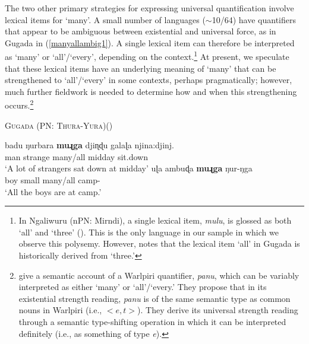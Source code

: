 \documentclass[12pt,egregdoesnotlikesansseriftitles]{scrartcl}
\begin{document}
The two other primary strategies for expressing universal quantification  involve lexical items for `many'. A small number of languages ($\sim$10/64) have quantifiers that appear to be ambiguous between existential and universal force, as in Gugada \textit{} in  (\ref{manyallambig1}). A single lexical item can therefore be interpreted as `many' or `all'/`every', depending on the context.\footnote{In Ngaliwuru (nPN: Mirndi), a single lexical item, \textit{mulu}, is glossed as both `all' and `three' (\citealt[77]{boltetal71}). This is the only language in our sample in which we observe this polysemy. However, \cite{platt72} notes that the lexical item \textit{{}} `all' in Gugada is historically derived from `three.'} At present, we speculate that these lexical items have an underlying meaning of `many' that can be strengthened to `all'/`every' in some contexts, perhaps pragmatically; however, much further fieldwork is needed to determine how and when this strengthening occurs.\footnote{\cite{bittnerhale95} give a semantic account of a Warlpiri quantifier, \textit{panu}, which can be variably interpreted as either `many' or `all'/`every.' They propose that in its existential strength reading, \textit{panu} is of the same semantic type as common nouns in Warlpiri (i.e., $<e,t>$). They derive its universal strength reading through a semantic type-shifting operation in which it can be interpreted definitely (i.e., as something of type \textit{e}).} %

\begin{exe}
  \ex \textsc{Gugada (PN: Thura-Yura)}\hfill (\citealt[56--65]{platt72}) \label{manyallambig1}
  \begin{xlist}
    \ex \gll badu ŋurbara \textbf{muɻga} {djiɳɖu galaɭa} njina:djinj. \\ 
    man  strange  many/all  midday         sit.down\\
    \glt `A lot of strangers sat down at midday'
    \ex \gll uɭa ambuɖa \textbf{muɻga} ŋur-ŋga\\
    boy   small    many/all      camp-\Loc\\
    \glt `All the boys are at camp.'%
  \end{xlist}
 \end{exe}
 
\end{document}
